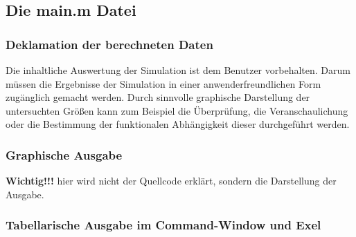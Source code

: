 \subsection*{Die main.m Datei}
\subsubsection{Deklamation der berechneten Daten}

Die inhaltliche Auswertung der Simulation ist dem Benutzer vorbehalten. Darum
müssen die Ergebnisse der Simulation in einer anwenderfreundlichen Form
zugänglich gemacht werden. Durch sinnvolle graphische Darstellung der
untersuchten Größen kann zum Beispiel die Überprüfung, die Veranschaulichung
oder die Bestimmung der funktionalen Abhängigkeit dieser durchgeführt werden.


\subsubsection*{Graphische Ausgabe}
\textbf{Wichtig!!!} hier wird nicht der Quellcode erklärt, sondern die
Darstellung der Ausgabe.  
\subsubsection{Tabellarische Ausgabe im Command-Window und Exel}

